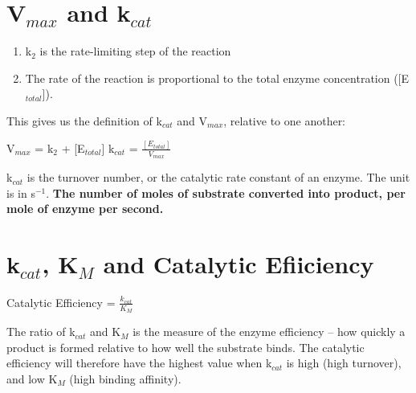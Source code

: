 \section{V$_{max}$ and k$_{cat}$}

\begin{center}
\end{center}

\begin{enumerate}
\item k$_2$ is the rate-limiting step of the reaction
\item The rate of the reaction is proportional to the total enzyme concentration ([E$_{total}$]).
\end{enumerate}

This gives us the definition of k$_{cat}$ and V$_{max}$, relative to one another:

\begin{center}
V$_{max}$ = k$_2$ + [E$_{total}$] \ch{->} k$_{cat}$ = $\frac{[E_{total}]}{V_{max}}$
\end{center}

k$_{cat}$ is the turnover number, or the catalytic rate constant of an enzyme.
The unit is in s$^{-1}$.
\textbf{The number of moles of substrate converted into product, per mole of enzyme per second.}

\section{k$_{cat}$, K$_M$ and Catalytic Efiiciency}

\begin{center}
Catalytic Efficiency = $\frac{k_{cat}}{K_M}$
\end{center}

The ratio of k$_{cat}$ and K$_M$ is the measure of the enzyme efficiency -- how quickly a product is formed relative to how well the substrate binds.
The catalytic efficiency will therefore have the highest value when k$_{cat}$ is high (high turnover), and low K$_M$ (high binding affinity).

